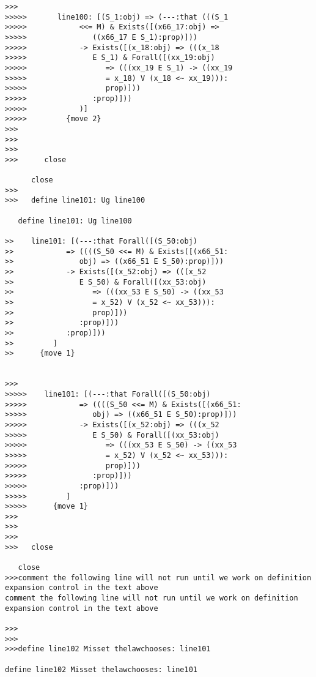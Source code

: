 \documentclass[12pt]{article}
\begin{document}
\begin{verbatim}
>>>
>>>>>       line100: [(S_1:obj) => (---:that (((S_1
>>>>>            <<= M) & Exists([(x66_17:obj) =>
>>>>>               ((x66_17 E S_1):prop)]))
>>>>>            -> Exists([(x_18:obj) => (((x_18
>>>>>               E S_1) & Forall([(xx_19:obj)
>>>>>                  => (((xx_19 E S_1) -> ((xx_19
>>>>>                  = x_18) V (x_18 <~ xx_19))):
>>>>>                  prop)]))
>>>>>               :prop)]))
>>>>>            )]
>>>>>         {move 2}
>>>
>>>
>>>
>>>      close

      close
>>>
>>>   define line101: Ug line100

   define line101: Ug line100

>>    line101: [(---:that Forall([(S_50:obj)
>>            => ((((S_50 <<= M) & Exists([(x66_51:
>>               obj) => ((x66_51 E S_50):prop)]))
>>            -> Exists([(x_52:obj) => (((x_52
>>               E S_50) & Forall([(xx_53:obj)
>>                  => (((xx_53 E S_50) -> ((xx_53
>>                  = x_52) V (x_52 <~ xx_53))):
>>                  prop)]))
>>               :prop)]))
>>            :prop)]))
>>         ]
>>      {move 1}


>>>
>>>>>    line101: [(---:that Forall([(S_50:obj)
>>>>>            => ((((S_50 <<= M) & Exists([(x66_51:
>>>>>               obj) => ((x66_51 E S_50):prop)]))
>>>>>            -> Exists([(x_52:obj) => (((x_52
>>>>>               E S_50) & Forall([(xx_53:obj)
>>>>>                  => (((xx_53 E S_50) -> ((xx_53
>>>>>                  = x_52) V (x_52 <~ xx_53))):
>>>>>                  prop)]))
>>>>>               :prop)]))
>>>>>            :prop)]))
>>>>>         ]
>>>>>      {move 1}
>>>
>>>
>>>
>>>   close

   close
>>>comment the following line will not run until we work on definition expansion control in the text above
comment the following line will not run until we work on definition expansion control in the text above

>>>
>>>
>>>define line102 Misset thelawchooses: line101

define line102 Misset thelawchooses: line101



\end{verbatim}
\end{document}
